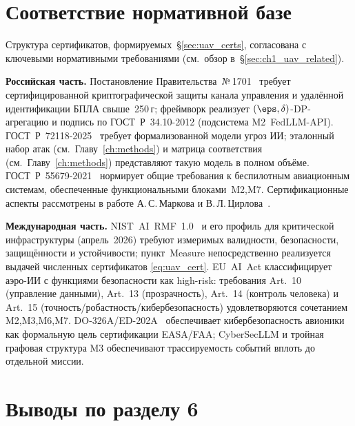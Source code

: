 \section{Соответствие нормативной базе}
\label{sec:uav_regulation}

Структура сертификатов, формируемых~\S\ref{sec:uav_certs}, согласована
с ключевыми нормативными требованиями (см.\ обзор
в~\S\ref{sec:ch1_uav_related}).

\noindent\textbf{Российская часть.}
Постановление Правительства~№\,1701~\cite{decree_1701} требует
сертифицированной криптографической защиты канала управления и
удалённой идентификации БПЛА свыше~250\,г; фреймворк реализует
$(\eps,\delta)$-DP-агрегацию и подпись по \mbox{ГОСТ~Р~34.10-2012}
(подсистема \textsf{M2~FedLLM-API}).
\mbox{ГОСТ~Р~72118-2025}~\cite{GOST_R_72118_2025} требует
формализованной модели угроз ИИ; эталонный набор атак
(см.\ Главу~\ref{ch:methods}) и матрица соответствия
(см.\ Главу~\ref{ch:methods}) представляют такую модель в полном объёме.
\mbox{ГОСТ~Р~55679-2021}~\cite{GOST_R_55679_2021} нормирует общие
требования к беспилотным авиационным системам, обеспеченные
функциональными блоками~\textsf{M2,M7}. Сертификационные аспекты
рассмотрены в работе А.\,С.\,Маркова и В.\,Л.\,Цирлова~\cite{Markov2023certify}.

\noindent\textbf{Международная часть.}
\mbox{NIST~AI~RMF~1.0}~\cite{nist_rmf_2023} и его профиль для
критической инфраструктуры (апрель~2026) требуют измеримых валидности,
безопасности, защищённости и устойчивости; пункт~\textsf{Measure}
непосредственно реализуется выдачей численных сертификатов
\eqref{eq:uav_cert}. \mbox{EU~AI~Act} классифицирует аэро-ИИ с
функциями безопасности как high-risk: требования Art.~10 (управление
данными), Art.~13 (прозрачность), Art.~14 (контроль человека) и
Art.~15 (точность/робастность/кибербезопасность) удовлетворяются
сочетанием \textsf{M2,M3,M6,M7}. \mbox{DO-326A/ED-202A}~\cite{do_326a_2024}
обеспечивает кибербезопасность авионики как формальную цель
сертификации EASA/FAA; \textsf{CyberSecLLM} и тройная графовая структура
\textsf{M3} обеспечивают трассируемость событий вплоть до отдельной
миссии.


\section{Выводы по разделу 6}
\label{sec:uav_summary}

